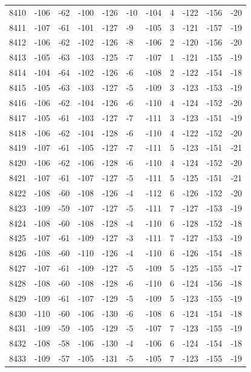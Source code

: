 \begin{table}[H]
\begin{tabular}{lllllllllll}
8410 & -106 & -62 & -100 & -126 & -10 & -104 & 4 & -122 & -156 & -20 \\
8411 & -107 & -61 & -101 & -127 & -9 & -105 & 3 & -121 & -157 & -19 \\
8412 & -106 & -62 & -102 & -126 & -8 & -106 & 2 & -120 & -156 & -20 \\
8413 & -105 & -63 & -103 & -125 & -7 & -107 & 1 & -121 & -155 & -19 \\
8414 & -104 & -64 & -102 & -126 & -6 & -108 & 2 & -122 & -154 & -18 \\
8415 & -105 & -63 & -103 & -127 & -5 & -109 & 3 & -123 & -153 & -19 \\
8416 & -106 & -62 & -104 & -126 & -6 & -110 & 4 & -124 & -152 & -20 \\
8417 & -105 & -61 & -103 & -127 & -7 & -111 & 3 & -123 & -151 & -19 \\
8418 & -106 & -62 & -104 & -128 & -6 & -110 & 4 & -122 & -152 & -20 \\
8419 & -107 & -61 & -105 & -127 & -7 & -111 & 5 & -123 & -151 & -21 \\
8420 & -106 & -62 & -106 & -128 & -6 & -110 & 4 & -124 & -152 & -20 \\
8421 & -107 & -61 & -107 & -127 & -5 & -111 & 5 & -125 & -151 & -21 \\
8422 & -108 & -60 & -108 & -126 & -4 & -112 & 6 & -126 & -152 & -20 \\
8423 & -109 & -59 & -107 & -127 & -5 & -111 & 7 & -127 & -153 & -19 \\
8424 & -108 & -60 & -108 & -128 & -4 & -110 & 6 & -128 & -152 & -18 \\
8425 & -107 & -61 & -109 & -127 & -3 & -111 & 7 & -127 & -153 & -19 \\
8426 & -108 & -60 & -110 & -126 & -4 & -110 & 6 & -126 & -154 & -18 \\
8427 & -107 & -61 & -109 & -127 & -5 & -109 & 5 & -125 & -155 & -17 \\
8428 & -108 & -60 & -108 & -128 & -6 & -110 & 6 & -124 & -156 & -18 \\
8429 & -109 & -61 & -107 & -129 & -5 & -109 & 5 & -123 & -155 & -19 \\
8430 & -110 & -60 & -106 & -130 & -6 & -108 & 6 & -124 & -154 & -18 \\
8431 & -109 & -59 & -105 & -129 & -5 & -107 & 7 & -123 & -155 & -19 \\
8432 & -108 & -58 & -106 & -130 & -4 & -106 & 6 & -124 & -154 & -18 \\
8433 & -109 & -57 & -105 & -131 & -5 & -105 & 7 & -123 & -155 & -19 \\

\end{tabular}
\end{table}
